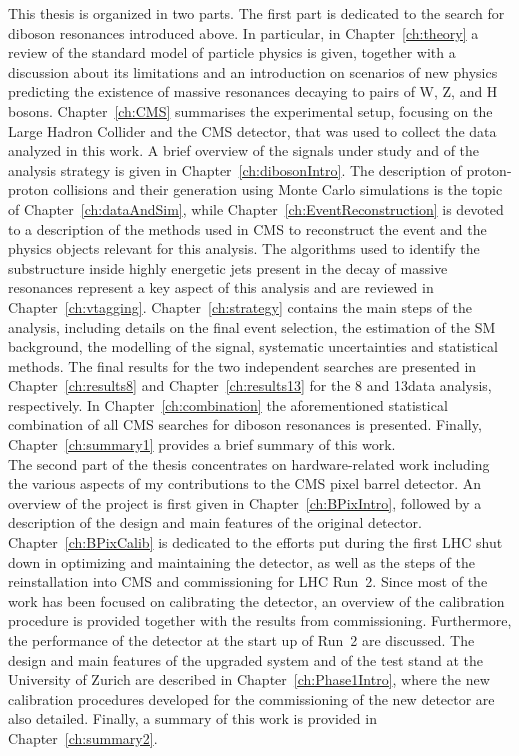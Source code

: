 This thesis is organized in two parts. The first part is dedicated to the search for diboson resonances introduced above. 
In particular, in Chapter~\ref{ch:theory} a review of the standard model of particle physics is given, together with a discussion about its limitations and an introduction on scenarios of new physics predicting the existence of massive resonances decaying to pairs of W, Z, and H bosons.
Chapter~\ref{ch:CMS} summarises the experimental setup, focusing on the Large Hadron Collider and the CMS detector, that was used to collect the data analyzed in this work.
A brief overview of the signals under study and of the analysis strategy is given in Chapter~\ref{ch:dibosonIntro}.
The description of proton-proton collisions and their generation using Monte Carlo simulations is the topic of Chapter~\ref{ch:dataAndSim}, while Chapter~\ref{ch:EventReconstruction} is devoted to a description of the methods used in CMS to reconstruct the event and the physics objects relevant for this analysis. The algorithms used to identify the substructure inside highly energetic jets present in the decay of massive resonances represent a key aspect of this analysis and are reviewed in Chapter~\ref{ch:vtagging}. Chapter~\ref{ch:strategy} contains the main steps of the analysis, including details on the final event selection, the estimation of the SM background, the modelling of the signal, systematic uncertainties and statistical methods. The final results for the two independent searches are presented in Chapter~\ref{ch:results8} and Chapter~\ref{ch:results13} for the 8 and 13\TeV data analysis, respectively.
In Chapter~\ref{ch:combination} the aforementioned statistical combination of all CMS searches for diboson resonances is presented. Finally, Chapter~\ref{ch:summary1} provides a brief summary of this work.\\

The second part of the thesis concentrates on hardware-related work including the various aspects of my contributions to the CMS pixel barrel detector.
An overview of the project is first given in Chapter~\ref{ch:BPixIntro}, followed by a description of the design and main features of the original detector.
Chapter~\ref{ch:BPixCalib} is dedicated to the efforts put during the first LHC shut down in optimizing and maintaining the detector, as well as the steps of the reinstallation into CMS and commissioning for LHC Run~2. Since most of the work has been focused on calibrating the detector, an overview of the calibration procedure is provided together with the results from commissioning. Furthermore, the performance of the detector at the start up of Run~2 are discussed.
The design and main features of the upgraded system and of the test stand at the University of Zurich are described in Chapter~\ref{ch:Phase1Intro}, where the new calibration procedures developed for the commissioning of the new detector are also detailed. Finally, a summary of this work is provided in Chapter~\ref{ch:summary2}.
